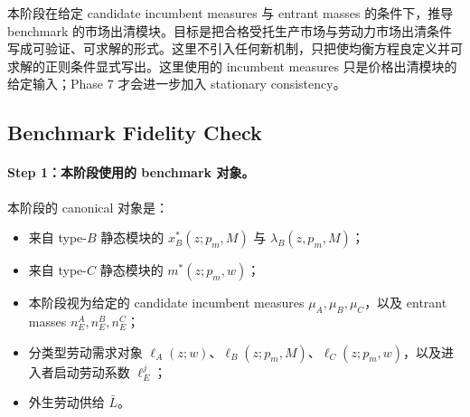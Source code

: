 






































































本阶段在给定 candidate incumbent measures 与 entrant masses 的条件下，推导 benchmark 的市场出清模块。目标是把合格受托生产市场与劳动力市场出清条件写成可验证、可求解的形式。这里不引入任何新机制，只把使均衡方程良定义并可求解的正则条件显式写出。这里使用的 incumbent measures 只是价格出清模块的给定输入；Phase 7 才会进一步加入 stationary consistency。

\subsection{Benchmark Fidelity Check}

\paragraph{Step 1：本阶段使用的 benchmark 对象。}
本阶段的 canonical 对象是：
\begin{itemize}
    \item 来自 type-$B$ 静态模块的 $x_B^*(z;p_m,M)$ 与 $\lambda_B(z,p_m,M)$；
    \item 来自 type-$C$ 静态模块的 $m^*(z;p_m,w)$；
    \item 本阶段视为给定的 candidate incumbent measures $\mu_A,\mu_B,\mu_C$，以及 entrant masses $n_E^A,n_E^B,n_E^C$；
    \item 分类型劳动需求对象 $\ell_A(z;w)$、$\ell_B(z;p_m,M)$、$\ell_C(z;p_m,w)$，以及进入者启动劳动系数 $\ell_E^j$；
    \item 外生劳动供给 $\bar L$。
\end{itemize}

